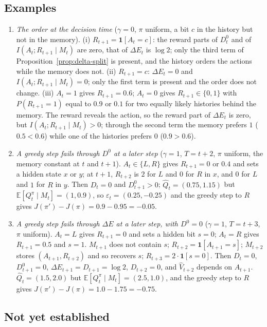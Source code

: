 \documentclass{article}
\theoremstyle{definition}
\theoremstyle{remark}
\newcommand{\E}{\mathbb{E}}
\newcommand{\dE}{\Delta E}
\begin{document}
\subsection{Examples}

\begin{enumerate}
\item \emph{The order at the decision time} ($\gamma=0$, $\pi$ uniform, a bit $c$ in the history but not in the memory). (i) $R_{t+1}=\mathbf 1[A_t=c]$: the reward parts of $D^0_t$ and of $I(A_t;R_{t+1}\mid M_t)$ are zero, that of $\dE_t$ is $\log2$; only the third term of Proposition~\ref{prop:delta-split} is present, and the history orders the actions while the memory does not. (ii) $R_{t+1}=c$: $\dE_t=0$ and $I(A_t;R_{t+1}\mid M_t)=0$; only the first term is present and the order does not change. (iii) $A_t=1$ gives $R_{t+1}=0.6$; $A_t=0$ gives $R_{t+1}\in\{0,1\}$ with $P(R_{t+1}=1)$ equal to $0.9$ or $0.1$ for two equally likely histories behind the memory. The reward reveals the action, so the reward part of $\dE_t$ is zero, but $I(A_t;R_{t+1}\mid M_t)>0$; through the second term the memory prefers $1$ ($0.5<0.6$) while one of the histories prefers $0$ ($0.9>0.6$).
\item \emph{A greedy step fails through $D^0$ at a later step} ($\gamma=1$, $T=t+2$, $\pi$ uniform, the memory constant at $t$ and $t+1$). $A_t\in\{L,R\}$ gives $R_{t+1}=0$ or $0.4$ and sets a hidden state $x$ or $y$; at $t+1$, $R_{t+2}$ is $2$ for $L$ and $0$ for $R$ in $x$, and $0$ for $L$ and $1$ for $R$ in $y$. Then $D_t=0$ and $D^0_{t+1}>0$; $\hat Q_t=(0.75,1.15)$ but $\E[Q^\pi_t\mid M_t]=(1,0.9)$, so $\varepsilon_t=(0.25,-0.25)$ and the greedy step to $R$ gives $J(\pi')-J(\pi)=0.9-0.95=-0.05$.
\item \emph{A greedy step fails through $\dE$ at a later step, with $D^0=0$} ($\gamma=1$, $T=t+3$, $\pi$ uniform). $A_t=L$ gives $R_{t+1}=0$ and sets a hidden bit $s=0$; $A_t=R$ gives $R_{t+1}=0.5$ and $s=1$. $M_{t+1}$ does not contain $s$; $R_{t+2}=\mathbf 1[A_{t+1}=s]$; $M_{t+2}$ stores $(A_{t+1},R_{t+2})$ and so recovers $s$; $R_{t+3}=2\cdot\mathbf 1[s=0]$. Then $D_t=0$, $D^0_{t+1}=0$, $\dE_{t+1}=D_{t+1}=\log2$, $D_{t+2}=0$, and $\hat V_{t+2}$ depends on $A_{t+1}$. $\hat Q_t=(1.5,2.0)$ but $\E[Q^\pi_t\mid M_t]=(2.5,1.0)$, and the greedy step to $R$ gives $J(\pi')-J(\pi)=1.0-1.75=-0.75$.
\end{enumerate}

\subsection{Not yet established}
\end{document}
